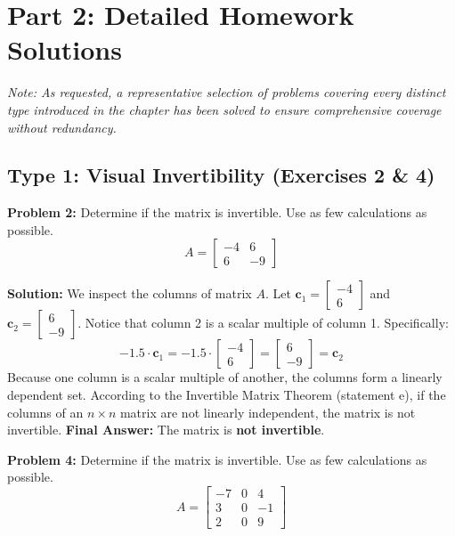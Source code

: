 \documentclass[12pt]{article}
\begin{document}
\section{Part 2: Detailed Homework Solutions}

\textit{Note: As requested, a representative selection of problems covering every distinct type introduced in the chapter has been solved to ensure comprehensive coverage without redundancy.}

\subsection{Type 1: Visual Invertibility (Exercises 2 \& 4)}

\textbf{Problem 2:} Determine if the matrix is invertible. Use as few calculations as possible.
\[
A = \begin{bmatrix} -4 & 6 \\ 6 & -9 \end{bmatrix}
\]

\textbf{Solution:}
We inspect the columns of matrix $A$. Let $\mathbf{c}_1 = \begin{bmatrix} -4 \\ 6 \end{bmatrix}$ and $\mathbf{c}_2 = \begin{bmatrix} 6 \\ -9 \end{bmatrix}$.
Notice that column 2 is a scalar multiple of column 1. Specifically:
\[
-1.5 \cdot \mathbf{c}_1 = -1.5 \cdot \begin{bmatrix} -4 \\ 6 \end{bmatrix} = \begin{bmatrix} 6 \\ -9 \end{bmatrix} = \mathbf{c}_2
\]
Because one column is a scalar multiple of another, the columns form a linearly dependent set. According to the Invertible Matrix Theorem (statement e), if the columns of an $n \times n$ matrix are not linearly independent, the matrix is not invertible. 
\textbf{Final Answer:} The matrix is \textbf{not invertible}.

\vspace{0.5cm}

\textbf{Problem 4:} Determine if the matrix is invertible. Use as few calculations as possible.
\[
A = \begin{bmatrix} -7 & 0 & 4 \\ 3 & 0 & -1 \\ 2 & 0 & 9 \end{bmatrix}
\]
\end{document}
